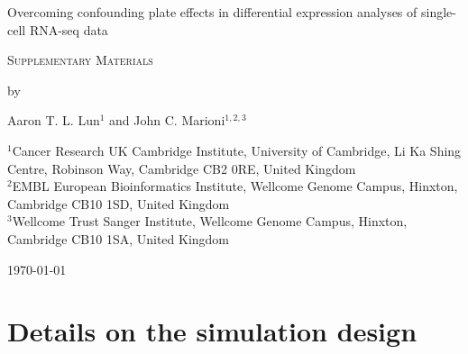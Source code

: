 \documentclass{article}
\begin{document}
\begin{titlepage}
\vspace*{3cm}
\begin{center}

{\LARGE
Overcoming confounding plate effects in differential expression analyses of single-cell RNA-seq data
\par}

\vspace{0.75cm}

{\Large 
    \textsc{Supplementary Materials}
\par
}
\vspace{0.75cm}

\large
by

\vspace{0.75cm}
Aaron T. L. Lun$^{1}$ and John C. Marioni$^{1,2,3}$

\vspace{1cm}
\begin{minipage}{0.9\textwidth}
\begin{flushleft} 
$^1$Cancer Research UK Cambridge Institute, University of Cambridge, Li Ka Shing Centre, Robinson Way, Cambridge CB2 0RE, United Kingdom \\[6pt]
$^2$EMBL European Bioinformatics Institute, Wellcome Genome Campus, Hinxton, Cambridge CB10 1SD, United Kingdom \\[6pt]
$^3$Wellcome Trust Sanger Institute, Wellcome Genome Campus, Hinxton, Cambridge CB10 1SA, United Kingdom \\[6pt]
\end{flushleft}
\end{minipage}

\vspace{1.5cm}
{\large \today{}}

\vspace*{\fill}
\end{center}
\end{titlepage}


\section{Details on the simulation design}
\end{document}
